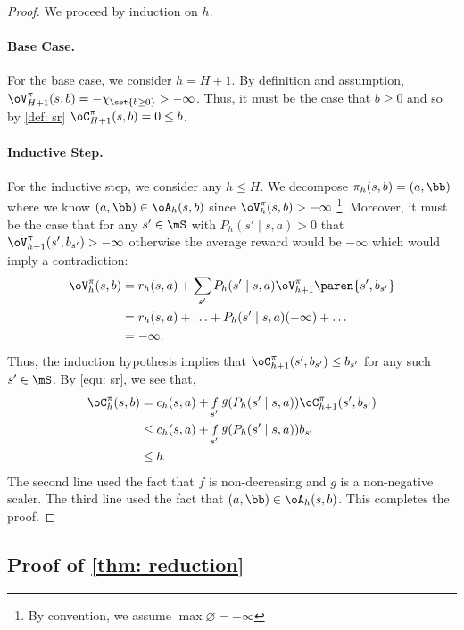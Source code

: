 \documentclass[pdftex, a4paper, 12pt]{article}
\DeclareMathOperator*{\f}{\mathit{f}}
\DeclareMathOperator*{\g}{\mathit{g}}
\begin{document}
\begin{proof}
    We proceed by induction on $h$. 
    
    \paragraph{Base Case.} For the base case, we consider $h = H+1$. By definition and assumption, $\oV^{\pi}_{H+1}(s,b) = -\chi_{\set{b \geq 0}} > -\infty$. Thus, it must be the case that $b \geq 0$ and so by \cref{def: sr} $\oC_{H+1}^{\pi}(s,b) = 0 \leq b$.

    \paragraph{Inductive Step.} For the inductive step, we consider any $h \leq H$. We decompose $\pi_h(s,b) = (a, \bb)$ where we know $(a,\bb) \in \oA_h(s,b)$ since $\oV^{\pi}_h(s,b) > -\infty$ \footnote{By convention, we assume $\max \varnothing = -\infty$}. Moreover, it must be the case that for any $s' \in \mS$ with $P_h(s' \mid s,a) > 0$ that $\oV_{h+1}^{\pi}(s', b_{s'}) > -\infty$ otherwise the average reward would be $-\infty$ which would imply a contradiction:
    \begin{align*}
        \oV^{\pi}_h(s,b) &= r_h(s,a) + \sum_{s'} P_h(s' \mid s,a) \oV_{h+1}^{\pi}\paren{s',b_{s'}} \\
        &= r_h(s,a) + \ldots  + P_h(s' \mid s,a) (-\infty) + \ldots \\
        &= -\infty.
    \end{align*}
    Thus, the induction hypothesis implies that $\oC^{\pi}_{h+1}(s', b_{s'}) \leq b_{s'}$ for any such $s' \in \mS$.
    By \eqref{equ: sr}, we see that,
    \begin{align*}
        \oC^{\pi}_h(s,b) &= c_h(s, a) + \f_{s'} \g(P_h(s' \mid s,a)) \oC^{\pi}_{h+1}(s',b_{s'}) \\
        &\leq c_h(s, a) + \f_{s'} \g(P_h(s' \mid s,a))b_{s'} \\
        &\leq b.
    \end{align*}
    The second line used the fact that $f$ is non-decreasing and $g$ is a non-negative scaler. The third line used the fact that $(a,\bb) \in \oA_h(s,b)$. This completes the proof.
\end{proof}


\subsection{Proof of \texorpdfstring{\cref{thm: reduction}}{thm: reduction}}
\end{document}
